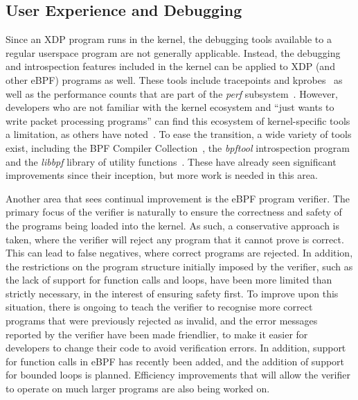 \documentclass[10pt,sigconf,anonymous]{acmart}
\begin{document}
\subsection{User Experience and Debugging}
\label{sec:user-exper-debugg}
Since an XDP program runs in the kernel, the debugging tools available to a
regular userspace program are not generally applicable. Instead, the debugging
and introspection features included in the kernel can be applied to XDP (and
other eBPF) programs as well. These tools include tracepoints and
kprobes~\cite{kernel-tracing} as well as the performance counts that are part of
the \emph{perf} subsystem~\cite{perf}. However, developers who are not familiar
with the kernel ecosystem and ``just wants to write packet processing programs''
can find this ecosystem of kernel-specific tools a limitation, as others have
noted~\cite{miano2018creating}. To ease the transition, a wide variety of tools
exist, including the BPF Compiler Collection~\cite{bcc}, the \emph{bpftool}
introspection program~\cite{bpftool} and the \emph{libbpf} library of utility
functions~\cite{libbpf}. These have already seen significant improvements since
their inception, but more work is needed in this area.

Another area that sees continual improvement is the eBPF program verifier. The
primary focus of the verifier is naturally to ensure the correctness and safety
of the programs being loaded into the kernel. As such, a conservative approach
is taken, where the verifier will reject any program that it cannot prove is
correct. This can lead to false negatives, where correct programs are rejected.
In addition, the restrictions on the program structure initially imposed by the
verifier, such as the lack of support for function calls and loops, have been
more limited than strictly necessary, in the interest of ensuring safety first.
To improve upon this situation, there is ongoing to teach the verifier to
recognise more correct programs that were previously rejected as invalid, and
the error messages reported by the verifier have been made friendlier, to make
it easier for developers to change their code to avoid verification errors. In
addition, support for function calls in eBPF has recently been added, and the
addition of support for bounded loops is planned. Efficiency improvements that
will allow the verifier to operate on much larger programs are also being worked
on.
\end{document}
